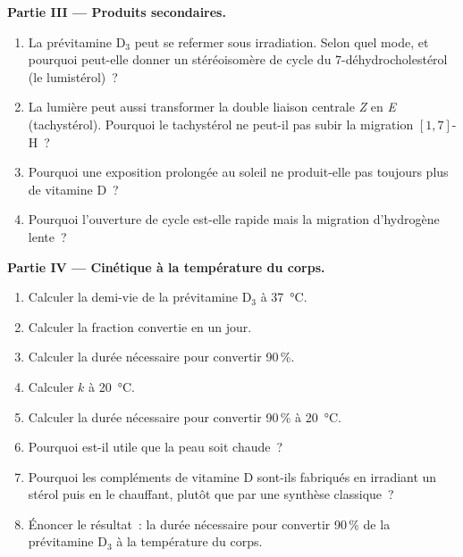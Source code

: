 \begin{problem}
\medskip\noindent\textbf{Partie III --- Produits secondaires.}
\begin{enumerate}[resume]
  \item La prévitamine D$_3$ peut se refermer sous irradiation. Selon quel mode, et pourquoi peut-elle donner un
        stéréoisomère de cycle du 7-déhydrocholestérol (le lumistérol)~?
  \item La lumière peut aussi transformer la double liaison centrale \textit{Z} en \textit{E} (tachystérol). Pourquoi
        le tachystérol ne peut-il pas subir la migration $[1,7]$-H~?
  \item Pourquoi une exposition prolongée au soleil ne produit-elle pas
        toujours plus de vitamine D~?
  \item Pourquoi l'ouverture de cycle est-elle rapide mais la migration
        d'hydrogène lente~?
\end{enumerate}

\medskip\noindent\textbf{Partie IV --- Cinétique à la température du corps.}
\begin{enumerate}[resume]
  \item Calculer la demi-vie de la prévitamine D$_3$ à \qty{37}{\celsius}.
  \item Calculer la fraction convertie en un jour.
  \item Calculer la durée nécessaire pour convertir 90\,\%.
  \item Calculer $k$ à \qty{20}{\celsius}.
  \item Calculer la durée nécessaire pour convertir 90\,\% à \qty{20}{\celsius}.
  \item Pourquoi est-il utile que la peau soit chaude~?
  \item Pourquoi les compléments de vitamine D sont-ils fabriqués en
        irradiant un stérol puis en le chauffant, plutôt que par une
        synthèse classique~?
  \item Énoncer le résultat~: la durée nécessaire pour convertir 90\,\% de la prévitamine D$_3$ à la température du corps.
\end{enumerate}
\end{problem}
